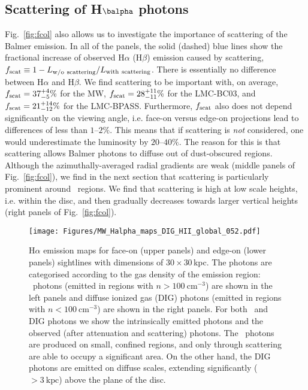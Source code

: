 \documentclass[fleqn,usenatbib]{mnras}
\newcommand\HII{\ion{H}{II}~} %
\begin{document}
\subsection{Scattering of H\texorpdfstring{$\balpha$}{α} photons}
\label{subsec:scattering}

Fig.~\ref{fig:fcol} also allows us to investigate the importance of scattering of the Balmer emission. In all of the panels, the solid (dashed) blue lines show the fractional increase of observed H$\alpha$ (H$\beta$) emission caused by scattering, $f_{\rm scat} \equiv 1 - L_{\rm w/o~scattering} / L_{\rm with~scattering}$. There is essentially no difference between H$\alpha$ and H$\beta$. We find scattering to be important with, on average, $f_{\rm scat}=37_{-5}^{+4}\%$ for the MW, $f_{\rm scat}=28_{-11}^{+11}\%$ for the LMC-BC03, and $f_{\rm scat}=21_{-12}^{+14}\%$ for the LMC-BPASS. Furthermore, $f_{\rm scat}$ also does not depend significantly on the viewing angle, i.e. face-on versus edge-on projections lead to differences of less than $1$--$2\%$. This means that if scattering is \textit{not} considered, one would underestimate the luminosity by $20$--$40\%$. The reason for this is that scattering allows Balmer photons to diffuse out of dust-obscured regions. Although the azimuthally-averaged radial gradients are weak (middle panels of Fig.~\ref{fig:fcol}), we find in the next section that scattering is particularly prominent around \HII regions. We find that scattering is high at low scale heights, i.e. within the disc, and then gradually decreases towards larger vertical heights (right panels of Fig.~\ref{fig:fcol}).

\begin{figure*}
\begin{center}
\texttt{[image: Figures/MW\_Halpha\_maps\_DIG\_HII\_global\_052.pdf]}
\caption{H$\alpha$ emission maps for face-on (upper panels) and edge-on (lower panels) sightlines with dimensions of $30\times30$\,kpc. The photons are categorised according to the gas density of the emission region: \HII photons (emitted in regions with $n>100~\mathrm{cm}^{-3}$) are shown in the left panels and diffuse ionized gas (DIG) photons (emitted in regions with $n<100~\mathrm{cm}^{-3}$) are shown in the right panels. For both \HII and DIG photons we show the intrinsically emitted photons and the observed (after attenuation and scattering) photons. The \HII photons are produced on small, confined regions, and only through scattering are able to occupy a significant area. On the other hand, the DIG photons are emitted on diffuse scales, extending significantly ($>3~\mathrm{kpc}$) above the plane of the disc.}
\label{fig:Halpha_map}
\end{center}
\end{figure*}
\end{document}
